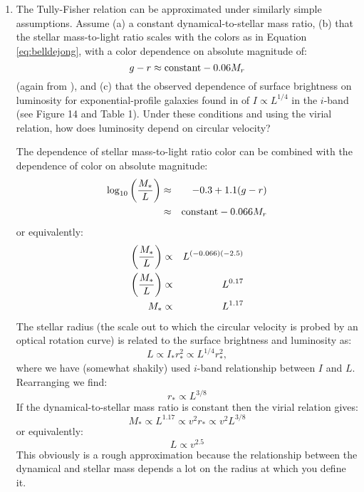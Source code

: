 \begin{enumerate}
\begin{enumerate}
\end{enumerate}
\item The Tully-Fisher relation can be approximated under similarly
simple assumptions. Assume (a) a constant dynamical-to-stellar mass ratio,
(b) that the stellar mass-to-light ratio scales with the colors as in
Equation \ref{eq:belldejong}, with a color dependence on absolute
magnitude of: 
\begin{equation}
g-r \approx {\rm constant} - 0.06 M_r
\end{equation}
(again from \citealt{blanton03d}), and (c) that the observed
dependence of surface brightness on luminosity for exponential-profile
galaxies found in \citet{blanton03d} of $I\propto L^{1/4}$ in the
$i$-band (see Figure 14 and Table 1). Under these conditions and using
the virial relation, how does luminosity depend on circular velocity?

\begin{answer}
The \citet{bell00a} dependence of stellar mass-to-light ratio color
can be combined with the dependence of color on absolute magnitude:
\begin{eqnarray}
\log_{10} \left(\frac{M_\ast}{L}\right) &\approx& -0.3 + 1.1 (g-r) \cr
&\approx& \mathrm{constant} - 0.066 M_r  \cr
\end{eqnarray}
or equivalently:
\begin{eqnarray}
\left(\frac{M_\ast}{L}\right) &\propto& L^{(-0.066)(-2.5)} \cr
\left(\frac{M_\ast}{L}\right) &\propto& L^{0.17} \cr
M_\ast &\propto& L^{1.17}
\end{eqnarray}
The stellar radius (the scale out to which the circular velocity is
probed by an optical rotation curve) is related to the surface
brightness and luminosity as:
\begin{equation}
L \propto I_\ast r_\ast^2 \propto L^{1/4} r_\ast^2,
\end{equation}
where we have (somewhat shakily) used $i$-band relationship between
$I$ and $L$.  Rearranging we find:
\begin{equation}
r_\ast \propto L^{3/8}
\end{equation}
If the dynamical-to-stellar mass ratio is constant then the virial
relation gives:
\begin{equation}
M_\ast \propto L^{1.17} \propto v^2 r_\ast \propto v^2 L^{3/8}
\end{equation}
or equivalently:
\begin{equation}
L \propto v^{2.5}
\end{equation}
This obviously is a rough approximation because the relationship
between the dynamical and stellar mass depends a lot on the radius at
which you define it.
\end{answer}
\end{enumerate}

